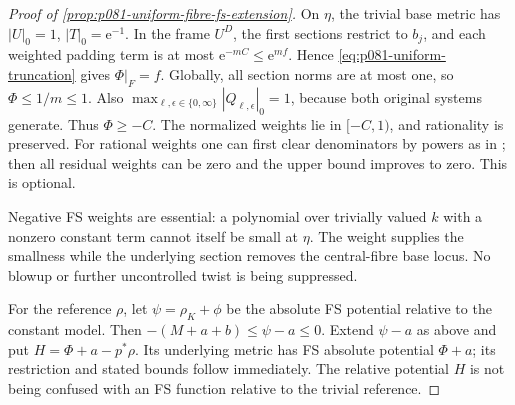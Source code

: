 \begin{proof}[Proof of \cref{prop:p081-uniform-fibre-fs-extension}]
On \(\eta\), the trivial base metric has \(|U|_0=1\),
\(|T|_0=\mathrm e^{-1}\). In the frame \(U^D\), the first sections
restrict to \(b_j\), and each weighted padding term is at most
\(\mathrm e^{-mC}\leq\mathrm e^{mf}\). Hence
\eqref{eq:p081-uniform-truncation} gives \(\Phi|_F=f\).
Globally, all section norms are at most one, so
\(\Phi\leq1/m\leq1\). Also
\(\max_{\ell,\epsilon\in\{0,\infty\}}|Q_{\ell,\epsilon}|_0=1\),
because both original systems generate. Thus \(\Phi\geq-C\).
The normalized weights lie in \([-C,1)\), and rationality is preserved.
For rational weights one can first clear denominators by powers as in
\cite[(2.9)]{BJ22}; then all residual weights can be zero and the upper
bound improves to zero. This is optional.

Negative FS weights are essential: a polynomial over trivially valued
\(k\) with a nonzero constant term cannot itself be small at \(\eta\).
The weight supplies the smallness while the underlying section removes
the central-fibre base locus. No blowup or further uncontrolled twist is
being suppressed.

For the reference \(\rho\), let \(\psi=\rho_K+\phi\) be the
absolute FS potential relative to the constant model. Then
\(-(M+a+b)\leq\psi-a\leq0\). Extend \(\psi-a\) as above and put
\(H=\Phi+a-p^*\rho\). Its underlying metric has FS absolute potential
\(\Phi+a\); its restriction and stated bounds follow immediately.
The relative potential \(H\) is not being confused with an FS function
relative to the trivial reference.
\end{proof}

